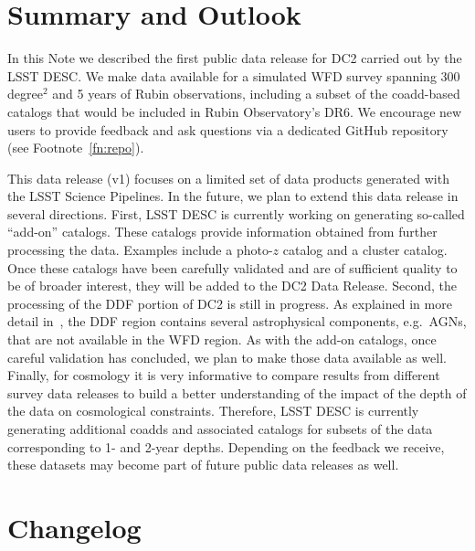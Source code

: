 \documentclass[modern]{descnote}
\begin{document}
\section{Summary and Outlook}
\label{sec:outlook}
In this Note we described the first public data release for DC2 carried out by the LSST DESC. We make data available for a simulated WFD survey spanning 300 degree$^2$ and 5 years of Rubin observations, including a subset of the coadd-based catalogs that would be included in Rubin Observatory's DR6. %
We encourage new users to provide feedback and ask questions via a dedicated GitHub repository (see Footnote~\ref{fn:repo}).

This data release (v1) focuses on a limited set of data products generated with the LSST Science Pipelines. In the future, we plan to extend this data release in several directions. First, LSST DESC is currently working on generating so-called ``add-on'' catalogs. These catalogs provide information obtained from further processing the data. Examples include a photo-$z$ catalog and a cluster catalog. Once these catalogs have been carefully validated and are of sufficient quality to be of broader interest, they will be added to the DC2 Data Release. Second, the processing of the DDF portion of DC2 is still in progress. As explained in more detail in~\cite{2020arXiv201005926L}, the DDF region contains several astrophysical components, e.g.~AGNs, that are not available in the WFD region. As with the add-on catalogs, once careful validation has concluded, we plan to make those data available as well. Finally, for cosmology it is very informative to compare results from different survey data releases to build a better understanding of the impact of the depth of the data on cosmological constraints. Therefore, LSST DESC is currently generating additional coadds and associated catalogs for subsets of the data corresponding to 1- and 2-year depths. Depending on the feedback we receive, these datasets may become part of future public data releases as well.


\clearpage
\appendix
\section{Changelog}

\end{document}
